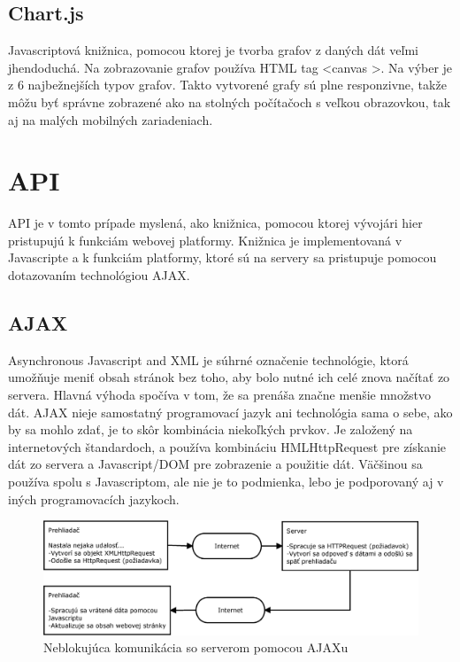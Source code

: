 \subsection{Chart.js}
\label{sec:chartjs}
Javascriptová knižnica, pomocou ktorej je tvorba grafov z daných dát veľmi jhendoduchá. Na zobrazovanie grafov používa HTML tag <canvas >. Na výber je z 6 najbežnejších typov grafov. Takto vytvorené grafy sú plne responzivne, takže môžu byť správne zobrazené ako na stolných počítačoch s veľkou obrazovkou, tak aj na malých mobilných zariadeniach.

\section{API}
\label{sec:api}
API je v tomto prípade myslená, ako knižnica, pomocou ktorej vývojári hier pristupujú k funkciám webovej platformy. Knižnica je implementovaná v Javascripte a k funkciám platformy, ktoré sú na servery sa pristupuje pomocou dotazovaním technológiou AJAX.

\subsection{AJAX}
\label{sec:ajax}
Asynchronous Javascript and XML je súhrné označenie technológie, ktorá umožňuje meniť obsah stránok bez toho, aby bolo nutné ich celé znova načítať zo servera. Hlavná výhoda spočíva v tom, že sa prenáša značne menšie množstvo dát. AJAX nieje samostatný programovací jazyk ani technológia sama o sebe, ako by sa mohlo zdať, je to skôr kombinácia niekoľkých prvkov. Je založený na internetových štandardoch, a používa kombináciu HMLHttpRequest pre získanie dát zo servera a Javascript/DOM pre zobrazenie a použitie dát. Väčšinou sa používa spolu s Javascriptom, ale nie je to podmienka, lebo je podporovaný aj v iných programovacích jazykoch.  
\begin{figure}[h]
  \centering
  \includegraphics[scale=0.35]{fig/ajax.eps}
  \caption{Neblokujúca komunikácia so serverom pomocou AJAXu}
  \label{fig:ajax}
\end{figure}

